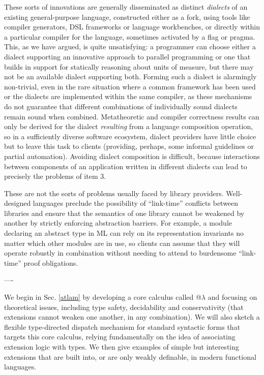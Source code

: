 These sorts of innovations are generally disseminated as distinct \emph{dialects} of an existing general-purpose language, constructed either as a fork, using tools like compiler generators, DSL frame\-works or  language workbenches, or directly within a particular compiler for the language, sometimes activated by a flag or pragma. This, as we have argued, is quite unsatisfying: a programmer can choose either a dialect supporting an innovative approach to parallel programming or one that builds in support for statically reasoning about units of measure, but there may not be an available dialect supporting both. Forming such a dialect is alarmingly non-trivial, even in the rare situation where a common framework has been used or the dialects are implemented within the same compiler, as these mechanisms do not guarantee that different combinations of individually sound dialects remain sound when combined. Metatheoretic and compiler correctness results can only be derived for the dialect \emph{resulting} from a language   composition operation, so in a sufficiently diverse software ecosystem, dialect providers have little choice but to leave this task to clients (providing, perhaps, some informal guidelines or partial automation). Avoiding dialect composition is difficult, because interactions between components of an application written in different dialects can lead to precisely the problems of item 3.%

These are not the sorts of problems usually faced by library providers. Well-designed languages preclude the  possibility of ``link-time'' conflicts between libraries and ensure that the semantics of one library  cannot be weakened by another by strictly enforcing abstraction barriers. For example, a module declaring an abstract type in ML can rely on its representation invariants no matter which other modules are in use, so clients can assume that they will operate robustly in combination without needing to attend to burdensome ``link-time'' proof obligations. 

----

We begin in Sec. \ref{atlam} by developing a core calculus called @$\lambda$ and focusing on theoretical issues, including type safety, decidability and {conservativity} (that extensions cannot weaken one another, in any combination). We will also sketch a flexible type-directed dispatch mechanism for standard syntactic forms that targets this core calculus, relying fundamentally on the idea of associating extension logic with types. We then give examples of simple but interesting extensions that are built into, or are only weakly definable, in modern functional languages. 

